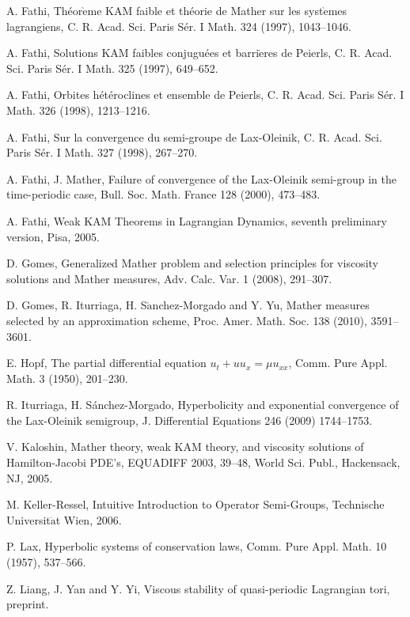 \documentclass{amsart}[12pt]
\theoremstyle{definition}
\theoremstyle{remark}
\numberwithin{equation}{section}
\begin{document}
\begin{thebibliography}{00}
A. Fathi, Th\'eor$\mathrm{\grave{e}}$me KAM faible et th\'eorie de
Mather sur les syst$\mathrm{\grave{e}}$mes lagrangiens,  C. R.
Acad. Sci. Paris S\'er. I Math. 324 (1997), 1043--1046.

A. Fathi, Solutions KAM faibles conjugu\'ees et
barri$\mathrm{\grave{e}}$res de Peierls, C. R. Acad. Sci. Paris
S\'er. I Math. 325 (1997), 649--652.

A. Fathi, Orbites h\'et\'eroclines et ensemble de Peierls, C. R.
Acad. Sci. Paris S\'er. I Math. 326 (1998), 1213--1216.

A. Fathi, Sur la convergence du semi-groupe de Lax-Oleinik, C. R.
Acad. Sci. Paris S\'er. I Math. 327 (1998), 267--270.

A. Fathi, J. Mather, Failure of convergence of the Lax-Oleinik
semi-group in the time-periodic case, Bull. Soc. Math. France 128
(2000), 473--483.

A. Fathi, Weak KAM Theorems in Lagrangian Dynamics, seventh
preliminary version, Pisa, 2005.

D. Gomes, Generalized Mather problem and selection principles for
viscosity solutions and Mather measures, Adv. Calc. Var. 1 (2008),
291--307.

D. Gomes, R. Iturriaga, H. S$\mathrm{\acute{a}}$nchez-Morgado and
Y. Yu, Mather measures selected by an approximation scheme, Proc.
Amer. Math. Soc. 138 (2010), 3591--3601.

E. Hopf, The partial differential equation $u_t + uu_x = \mu
u_{xx}$, Comm. Pure Appl. Math. 3 (1950), 201--230.

R. Iturriaga, H. S\'anchez-Morgado, Hyperbolicity and exponential
convergence of the Lax-Oleinik semigroup, J. Differential
Equations 246 (2009) 1744--1753.

V. Kaloshin,  Mather theory, weak KAM theory, and viscosity
solutions of Hamilton-Jacobi PDE's, EQUADIFF 2003, 39--48, World
Sci. Publ., Hackensack, NJ, 2005.

M. Keller-Ressel, Intuitive Introduction to Operator Semi-Groups,
Technische Universit$\mathrm{\ddot{a}}$t Wien, 2006.

P. Lax, Hyperbolic systems of conservation laws, Comm. Pure Appl.
Math. 10 (1957), 537--566.

Z. Liang, J. Yan and Y. Yi, Viscous stability of quasi-periodic
Lagrangian tori, preprint.


\end{thebibliography}
\end{document}
